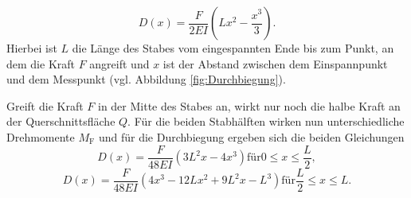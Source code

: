 \begin{equation}
	\label{eqn:d_x_einseitig}
	D(x)=\frac{F}{2EI}\left(Lx^2-\frac{x^3}{3}\right) \text{.}
\end{equation}
Hierbei ist $L$ die Länge des Stabes vom eingespannten Ende bis zum Punkt, an dem die Kraft $F$ angreift und $x$ ist der Abstand zwischen dem Einspannpunkt und dem Messpunkt (vgl. Abbildung \ref{fig:Durchbiegung}).

Greift die Kraft $F$ in der Mitte des Stabes an, wirkt nur noch die halbe Kraft an der Querschnittsfläche $Q$. Für die beiden Stabhälften wirken nun unterschiedliche Drehmomente $M_{\mathrm{F}}$ und für die Durchbiegung ergeben sich die beiden Gleichungen
\begin{equation}
	\label{eqn:d_x_beidseitig_eins}
	D(x)=\frac{F}{48EI}\left(3L^2x-4x^3\right) \mathrm{ für } 0\leq x\leq\frac{L}{2} \mathrm{,}
\end{equation}
\begin{equation}
	\label{eqn:d_x_beidseitig_zwei}
	D(x)=\frac{F}{48EI}\left(4x^3-12 Lx^2+9 L^2x-L^3\right) \mathrm{ für } \frac{L}{2}\leq x \leq L \mathrm{.}
\end{equation}
